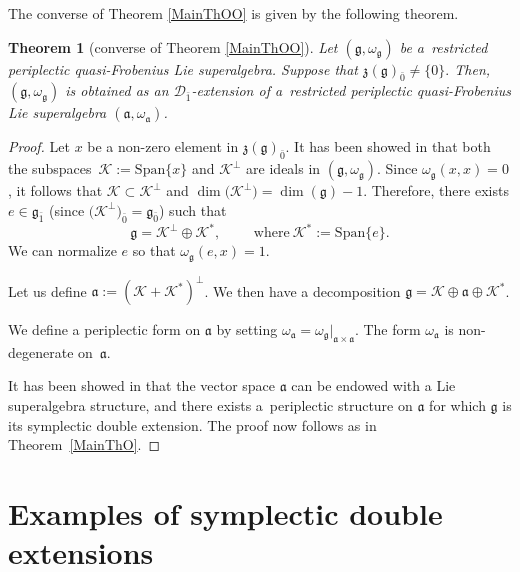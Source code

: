 \documentclass[10pt,a4paper]{amsart}
\numberwithin{equation}{section}
\newtheorem{Theorem}{Theorem}[section]
\begin{document}
The converse of Theorem \ref{MainThOO} is given by the following theorem.

\begin{Theorem}[converse of Theorem \ref{MainThOO}]
\label{Rec4}
Let $(\mathfrak{g},\omega_\mathfrak{g})$ be a~restricted periplectic quasi-Frobenius Lie superalgebra. Suppose that $\mathfrak{z}(\mathfrak{g})_{\bar 0}\not=\{0\}.$ Then, $(\mathfrak{g},\omega_\mathfrak{g})$ is obtained as an ${\mathscr D}_{\bar 1}$-extension of a~restricted periplectic quasi-Frobenius Lie superalgebra $(\mathfrak{a},\omega_\mathfrak{a})$.

\end{Theorem}
\begin{proof}

Let $x$ be a non-zero element in $\mathfrak{z}(\mathfrak{g})_{\bar 0}$. It has been showed in \cite{BM} that both the subspaces~$\mathscr{K}:=\mathrm{Span}\{x\}$ and $\mathscr{K}^\perp$ are ideals in $(\mathfrak{g},\omega_\mathfrak{g})$. Since $\omega_\mathfrak{g}(x,x)=0$, it follows that $\mathscr{K}\subset \mathscr{K}^\perp$ and $\dim\bigl(\mathscr{K}^\perp\bigr)=\dim(\mathfrak{g})-1$. Therefore, there exists $e \in \mathfrak{g}_{\bar 1}$ \big(since $\bigl(\mathscr{K}^\perp\bigr)_{\bar 0}=\mathfrak{g}_{\bar 0}$\big) such that
\[
\mathfrak{g}=\mathscr{K}^\perp\oplus \mathscr{K}^*, \qquad \text{ where}\ \mathscr{K}^*:=\mathrm{Span}\{e\}.
\]
We can normalize $e$ so that $\omega_\mathfrak{g}(e,x)=1$.

Let us define $\mathfrak{a}:=(\mathscr{K} +\mathscr{K}^*)^\perp$. We then have a decomposition $\mathfrak{g}=\mathscr{K} \oplus \mathfrak{a} \oplus \mathscr{K}^*$.

We define a periplectic form on $\mathfrak{a}$ by setting $
\omega_\mathfrak{a}={\omega_\mathfrak{g}}\vert_{\mathfrak{a}\times \mathfrak{a}}.
$
The form $\omega_\mathfrak{a}$ is non-degenerate on~$\mathfrak{a}$.

It has been showed in \cite{BM} that the vector space $\mathfrak{a}$ can be endowed with a Lie superalgebra structure, and there exists a~periplectic structure on $\mathfrak{a}$ for which $\mathfrak{g}$ is its symplectic double extension. The proof now follows as in Theorem~\ref{MainThO}.\end{proof}
\section{Examples of symplectic double extensions}\label{sec5}
\end{document}
